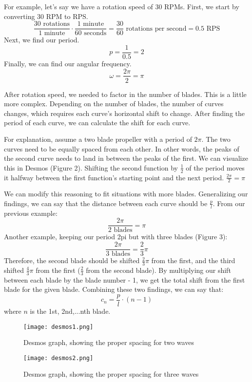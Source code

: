 For example, let's say we have a rotation speed of 30 RPMs. First, we start by converting 30 RPM to RPS.
\[\frac{30\mbox{ rotations}}{1\mbox{ minute}}\cdot\frac{1\mbox{ minute}}{60\mbox{ seconds}}=\frac{30}{60}\mbox{ rotations per second}=0.5\mbox{ RPS}\]
Next, we find our period.
\[p=\frac{1}{0.5}=2\]
Finally, we can find our angular frequency. 
\[\omega=\frac{2\pi}{2}=\pi\]

After rotation speed, we needed to factor in the number of blades. This is a little more complex. Depending on the number of blades, the number of curves changes, which requires each curve’s horizontal shift to change. After finding the period of each curve, we can calculate the shift for each curve. 

For explanation, assume a two blade propeller with a period of \(2\pi\). The two curves need to be equally spaced from each other. In other words, the peaks of the second curve needs to land in between the peaks of the first. We can visualize this in Desmos (Figure 2). Shifting the second function by \(\frac{1}{2}\) of the period moves it halfway between the first function’s starting point and the next period. \(\frac{2\pi}{2}=\pi\)

We can modify this reasoning to fit situations with more blades. Generalizing our findings, we can say that the distance between each curve should be \(\frac{p}{l}\). From our previous example:
\[\frac{2\pi}{2\mbox{ blades}}=\pi\]
Another example, keeping our period 2pi but with three blades (Figure 3):
\[\frac{2\pi}{3\mbox{ blades}}=\frac{2}{3}\pi\]
Therefore, the second blade should be shifted \(\frac{2}{3}\pi\) from the first, and the third shifted \(\frac{4}{3}\pi\) from the first (\(\frac{2}{3}\) from the second blade). By multiplying our shift between each blade by the blade number - 1, we get the total shift from the first blade for the given blade. Combining these two findings, we can say that:
\[c_n=\frac{p}{l}\cdot(n - 1)\]
where \(n\) is the 1st, 2nd,...nth blade.
\renewcommand{\thefigure}{2}
\begin{figure}[ht]
\texttt{[image: desmos1.png]}
\caption{Desmos graph, showing the proper spacing for two waves}
\label{fig:desmos1}
\end{figure}

\renewcommand{\thefigure}{3}
\begin{figure}[ht]
\texttt{[image: desmos2.png]}
\caption{Desmos graph, showing the proper spacing for three waves}
\label{fig:desmos2}
\end{figure}

